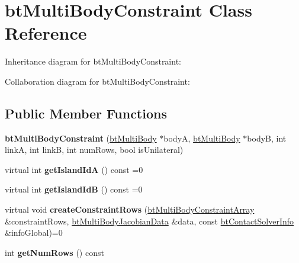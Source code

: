 \hypertarget{classbt_multi_body_constraint}{\section{bt\+Multi\+Body\+Constraint Class Reference}
\label{classbt_multi_body_constraint}
}


Inheritance diagram for bt\+Multi\+Body\+Constraint\+:


Collaboration diagram for bt\+Multi\+Body\+Constraint\+:
\subsection*{Public Member Functions}
\begin{DoxyCompactItemize}
\item 
\hypertarget{classbt_multi_body_constraint_aab943d7ae4486ecac8029f984d955894}{{\bfseries bt\+Multi\+Body\+Constraint} (\hyperlink{classbt_multi_body}{bt\+Multi\+Body} $\ast$body\+A, \hyperlink{classbt_multi_body}{bt\+Multi\+Body} $\ast$body\+B, int link\+A, int link\+B, int num\+Rows, bool is\+Unilateral)}\label{classbt_multi_body_constraint_aab943d7ae4486ecac8029f984d955894}

\item 
\hypertarget{classbt_multi_body_constraint_a1e78beb29c2694257d6ca681cea2cfda}{virtual int {\bfseries get\+Island\+Id\+A} () const =0}\label{classbt_multi_body_constraint_a1e78beb29c2694257d6ca681cea2cfda}

\item 
\hypertarget{classbt_multi_body_constraint_ab305c7ace79332a44134319a9816022a}{virtual int {\bfseries get\+Island\+Id\+B} () const =0}\label{classbt_multi_body_constraint_ab305c7ace79332a44134319a9816022a}

\item 
\hypertarget{classbt_multi_body_constraint_a9c20d0b45e909da415345c48cbd99ffa}{virtual void {\bfseries create\+Constraint\+Rows} (\hyperlink{classbt_aligned_object_array}{bt\+Multi\+Body\+Constraint\+Array} \&constraint\+Rows, \hyperlink{structbt_multi_body_jacobian_data}{bt\+Multi\+Body\+Jacobian\+Data} \&data, const \hyperlink{structbt_contact_solver_info}{bt\+Contact\+Solver\+Info} \&info\+Global)=0}\label{classbt_multi_body_constraint_a9c20d0b45e909da415345c48cbd99ffa}

\item 
\hypertarget{classbt_multi_body_constraint_a1f2806c134019ba20df2d099d73b9778}{int {\bfseries get\+Num\+Rows} () const }\label{classbt_multi_body_constraint_a1f2806c134019ba20df2d099d73b9778}


\end{DoxyCompactItemize}
